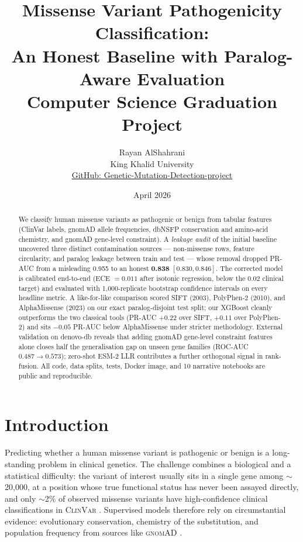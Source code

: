 \documentclass[11pt,a4paper]{article}
\title{
    \vspace{-2em}
    \textbf{Missense Variant Pathogenicity Classification:\\
    An Honest Baseline with Paralog-Aware Evaluation}\\[0.4em]
    \large Computer Science Graduation Project
}
\author{
    Rayan AlShahrani \\
    \small King Khalid University \\
    \small \href{https://github.com/RayanAlDwlah/Genetic-Mutation-Detection-project}{GitHub: Genetic-Mutation-Detection-project}
}
\date{April 2026}
\begin{document}
\maketitle
\thispagestyle{empty}

\begin{abstract}
    We classify human missense variants as pathogenic or benign from
    tabular features (ClinVar labels, gnomAD allele frequencies, dbNSFP
    conservation and amino-acid chemistry, and gnomAD gene-level
    constraint). A \emph{leakage audit} of the initial baseline uncovered
    three distinct contamination sources --- non-missense rows, feature
    circularity, and paralog leakage between train and test --- whose
    removal dropped PR-AUC from a misleading 0.955 to an honest
    \textbf{0.838} \([0.830, 0.846]\). The corrected model is
    calibrated end-to-end (ECE \(= 0.011\) after isotonic regression,
    below the 0.02 clinical target) and evaluated with 1{,}000-replicate
    bootstrap confidence intervals on every headline metric. A
    like-for-like comparison scored SIFT (2003), PolyPhen-2 (2010),
    and AlphaMissense (2023) on our exact paralog-disjoint test
    split; our XGBoost cleanly outperforms the two classical tools
    (PR-AUC \(+0.22\) over SIFT, \(+0.11\) over PolyPhen-2) and sits
    \(-0.05\) PR-AUC below AlphaMissense under stricter
    methodology. External validation on denovo-db reveals that
    adding gnomAD gene-level constraint features alone closes half
    the generalisation gap on unseen gene families
    (ROC-AUC \(0.487 \to 0.573\)); zero-shot ESM-2 LLR contributes
    a further orthogonal signal in rank-fusion. All code, data
    splits, tests, Docker image, and 10 narrative notebooks are
    public and reproducible.
\end{abstract}

\section{Introduction}

Predicting whether a human missense variant is pathogenic or benign
is a long-standing problem in clinical genetics. The challenge
combines a biological and a statistical difficulty: the variant of
interest usually sits in a single gene among \(\sim\)20{,}000, at a
position whose true functional status has never been assayed
directly, and only \(\sim\)2\% of observed missense variants have
high-confidence clinical classifications in \textsc{ClinVar}
\citep{landrum2020clinvar}. Supervised models therefore rely on
circumstantial evidence: evolutionary conservation, chemistry of
the substitution, and population frequency from sources like
\textsc{gnomAD} \citep{karczewski2020gnomad}.
\end{document}
